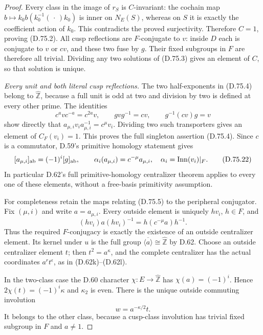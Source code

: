 \begin{proof}
Every class in the image of $r_S$ is
$C$-invariant: the cochain map
$b\mapsto k_0 b(k_0^{-1}(\,\cdot\,)k_0)$ is
inner on $N_E(S)$, whereas on $S$ it is exactly
the coefficient action of $k_0$.
This contradicts the proved surjectivity.
Therefore $C=1$, proving (D.75.2).
All cusp reflections are $F$-conjugate to $v$:
inside $D$ each is conjugate to $v$ or $cv$,
and these two fuse by $g$.  Their fixed
subgroups in $F$ are therefore all trivial.
Dividing any two solutions of (D.75.3) gives
an element of $C$, so that solution is unique.

\emph{Every unit and both literal cusp reflections.}
The two half-exponents in (D.75.4) belong
to $\widehat{\mathbb Z}$, because a full unit
is odd at two and division by two is defined
at every other prime.  The identities
\[
 c^a v c^{-a}=c^{2a}v,\qquad
                 gvg^{-1}=cv,\qquad g^{-1}(cv)g=v
                                                               \tag{D.75.21}
\]
show directly that
$a_{\mu,i}v_i a_{\mu,i}^{-1}=c^\mu v_i$.
Dividing two such transporters gives an
element of $C_F(v_i)=1$.  This proves
the full singleton assertion (D.75.4).
Since $c$ is a commutator, D.59's primitive
homology statement gives
\[
 [a_{\mu,i}]_{\rm ab}=(-1)^i[g]_{\rm ab},\qquad
          \alpha_i(a_{\mu,i})=c^{-\mu}a_{\mu,i},
      \quad \alpha_i=\operatorname{Inn}(v_i)|_F .
                                                               \tag{D.75.22}
\]
In particular D.62's full primitive-homology
centralizer theorem applies to every one of
these elements, without a free-basis
primitivity assumption.

For completeness retain the maps relating
(D.75.5) to the peripheral conjugator.
Fix $(\mu,i)$ and write $a=a_{\mu,i}$.
Every outside element is uniquely $hv_i$,
$h\in F$, and
\[
             (hv_i)a(hv_i)^{-1}
                         =h(c^{-\mu}a)h^{-1}.
                                                               \tag{D.75.23}
\]
Thus the required $F$-conjugacy is exactly
the existence of an outside centralizer
element.  Its kernel under $u$ is the full
group $\overline{\langle a\rangle}\cong
\widehat{\mathbb Z}$ by D.62.
Choose an outside centralizer element $t$;
then $t^2=a^\kappa$, and the complete
centralizer has the actual coordinates
$a^r t^\epsilon$, as in (D.62k)--(D.62l).

In the two-class case the D.60 character
$\chi:E\to\widehat{\mathbb Z}$ has
$\chi(a)=(-1)^i$.  Hence
$2\chi(t)=(-1)^i\kappa$ and $\kappa_2$ is even.
There is the unique outside commuting involution
\[
                         w=a^{-\kappa/2}t .
                                                               \tag{D.75.24}
\]
It belongs to the other class, because a
cusp-class involution has trivial fixed
subgroup in $F$ and $a\ne1$.


\end{proof}
